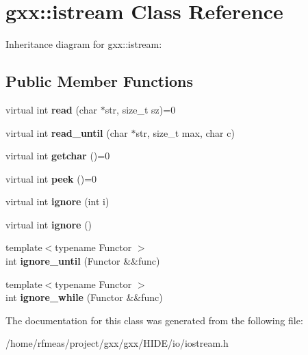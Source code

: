 \hypertarget{classgxx_1_1istream}{}\section{gxx\+:\+:istream Class Reference}
\label{classgxx_1_1istream}


Inheritance diagram for gxx\+:\+:istream\+:
\subsection*{Public Member Functions}
\begin{DoxyCompactItemize}
\item 
virtual int {\bfseries read} (char $\ast$str, size\+\_\+t sz)=0\hypertarget{classgxx_1_1istream_a36070e7f4efb9eb42514f044fbfe88b9}{}\label{classgxx_1_1istream_a36070e7f4efb9eb42514f044fbfe88b9}

\item 
virtual int {\bfseries read\+\_\+until} (char $\ast$str, size\+\_\+t max, char c)\hypertarget{classgxx_1_1istream_a1da5bb3299905a605055bd0ae8774e8b}{}\label{classgxx_1_1istream_a1da5bb3299905a605055bd0ae8774e8b}

\item 
virtual int {\bfseries getchar} ()=0\hypertarget{classgxx_1_1istream_a8cf013e3b34f7d47180432462beb0e08}{}\label{classgxx_1_1istream_a8cf013e3b34f7d47180432462beb0e08}

\item 
virtual int {\bfseries peek} ()=0\hypertarget{classgxx_1_1istream_a8c23cc3995a88e75bf0b147313c10e12}{}\label{classgxx_1_1istream_a8c23cc3995a88e75bf0b147313c10e12}

\item 
virtual int {\bfseries ignore} (int i)\hypertarget{classgxx_1_1istream_a205b1d77a6b8fc4758a601487f5ef323}{}\label{classgxx_1_1istream_a205b1d77a6b8fc4758a601487f5ef323}

\item 
virtual int {\bfseries ignore} ()\hypertarget{classgxx_1_1istream_a794daaf508035be9dd13eaee29aae587}{}\label{classgxx_1_1istream_a794daaf508035be9dd13eaee29aae587}

\item 
{\footnotesize template$<$typename Functor $>$ }\\int {\bfseries ignore\+\_\+until} (Functor \&\&func)\hypertarget{classgxx_1_1istream_ab2130ba48ef452067d3f1bc1d18e2300}{}\label{classgxx_1_1istream_ab2130ba48ef452067d3f1bc1d18e2300}

\item 
{\footnotesize template$<$typename Functor $>$ }\\int {\bfseries ignore\+\_\+while} (Functor \&\&func)\hypertarget{classgxx_1_1istream_aaf0802e9430b4db44bc0bd1eac788458}{}\label{classgxx_1_1istream_aaf0802e9430b4db44bc0bd1eac788458}

\end{DoxyCompactItemize}


The documentation for this class was generated from the following file\+:\begin{DoxyCompactItemize}
\item 
/home/rfmeas/project/gxx/gxx/\+H\+I\+D\+E/io/iostream.\+h\end{DoxyCompactItemize}
